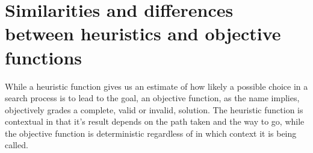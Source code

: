 \section*{Similarities and differences between heuristics and objective functions}

While a heuristic function gives us an estimate of how likely a possible choice in a search process is to lead to the goal, an objective function, as the name implies, objectively grades a complete, valid or invalid, solution. The heuristic function is contextual in that it's result depends on the path taken and the way to go, while the objective function is deterministic regardless of in which context it is being called.
